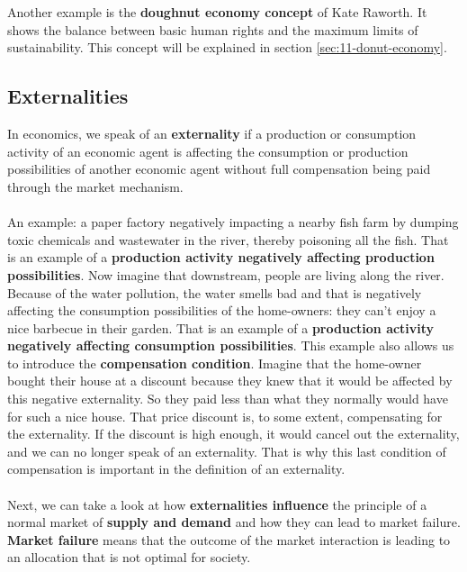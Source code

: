 \documentclass[../summary.tex]{subfiles}
\begin{document}
	\\\\
	Another example is the \textbf{doughnut economy concept} of Kate Raworth. It shows the balance between basic human rights and the maximum limits of sustainability. This concept will be explained in section \ref{sec:11-donut-economy}.
	 
	\newpage
	\subsection{Externalities}
	 
	In economics, we speak of an \textbf{externality} if a production or consumption activity of an economic agent is affecting the consumption or production possibilities of another economic agent without full compensation being paid through the market mechanism. 
	\\\\
	An example: a paper factory negatively impacting a nearby fish farm by dumping toxic chemicals and wastewater in the river, thereby poisoning all the fish. That is an example of a \textbf{production activity negatively affecting production possibilities}. Now imagine that downstream, people are living along the river. Because of the water pollution, the water smells bad and that is negatively affecting the consumption possibilities of the home-owners: they can't enjoy a nice barbecue in their garden. That is an example of a \textbf{production activity negatively affecting consumption possibilities}. This example also allows us to introduce the \textbf{compensation condition}. Imagine that the home-owner bought their house at a discount because they knew that it would be affected by this negative externality. So they paid less than what they normally would have for such a nice house. That price discount is, to some extent, compensating for the externality. If the discount is high enough, it would cancel out the externality, and we can no longer speak of an externality. That is why this last condition of compensation is important in the definition of an externality.
	\\\\
	Next, we can take a look at how \textbf{externalities influence} the principle of a normal market of \textbf{supply and demand} and how they can lead to market failure. \textbf{Market failure} means that the outcome of the market interaction is leading to an allocation that is not optimal for society.
	\\\\
\end{document}

